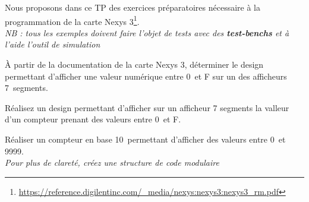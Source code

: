 \documentclass[12pt]{tdtp}
\begin{document}
\titre
Nous proposons dans ce TP des exercices préparatoires nécessaire à la programmation de la carte Nexys 3\footnote{\url{https://reference.digilentinc.com/_media/nexys:nexys3:nexys3_rm.pdf}}.\\
\textit {NB : tous les exemples doivent faire l'objet de tests avec des \textbf{test-benchs} et à l'aide l'outil de simulation}


\Exo

 À partir de la documentation de la carte Nexys 3, déterminer le design permettant d'afficher une valeur numérique entre 0 et F sur un des afficheurs 7 segments.
\Exo

Réalisez un design permettant d'afficher sur un afficheur 7 segments la valleur d'un compteur prenant des valeurs entre 0 et F.

\Exo 

Réaliser un compteur en base 10 permettant d'afficher des valeurs entre 0 et 9999.\\
\textit{Pour plus de clareté, créez une structure de code modulaire}

\end{document}
